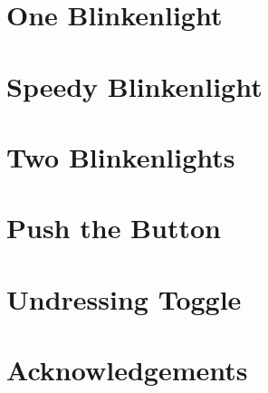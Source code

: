 \documentclass[a5paper]{scrbook}
\begin{document}
	


\tableofcontents

\chapter{One Blinkenlight\label{ch1}}


\chapter{Speedy Blinkenlight\label{ch2}}
%

\chapter{Two Blinkenlights\label{ch3}}
%

\chapter{Push the Button\label{ch4}}
%

\chapter{Undressing Toggle\label{ch5}}
%

\chapter{Acknowledgements\label{acknowledgements}}

\end{document}
